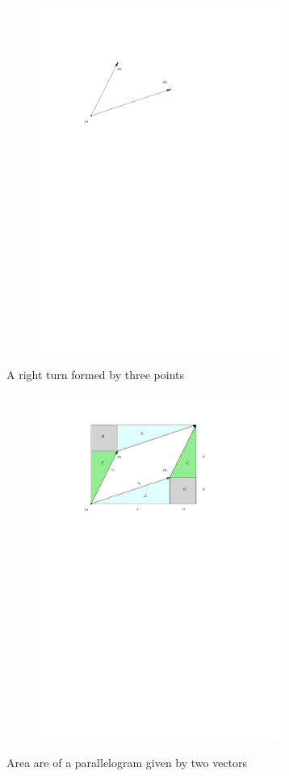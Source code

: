 \begin{figure}[H]
	
    \centering
	\begin{subfigure}{.7\textwidth}
		\includegraphics[width=8cm]{figures/rightturn1.pdf}
		\caption{}
		\label{fig:rightturn_a}
	\end{subfigure}
	\caption{A right turn formed by three points}
	\begin{subfigure}{.7\textwidth}
		\includegraphics[width=8cm]{figures/rightturn2.pdf}
		\caption{}
		\label{fig:rightturn_b}
	\end{subfigure}
	\caption{Area are of a parallelogram given by two vectors}
\end{figure}

